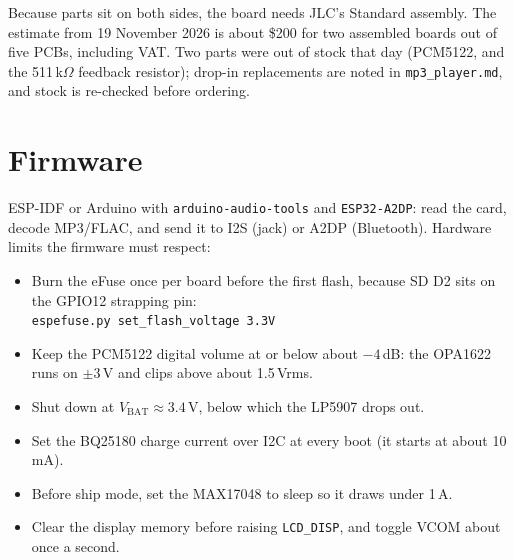 \documentclass[11pt,a4paper]{article}
\begin{document}
Because parts sit on both sides, the board needs JLC's Standard assembly. The estimate from 19 November 2026 is about \$200
for two assembled boards out of five PCBs, including VAT. Two parts were out of stock that day (PCM5122, and the 511\,k$\Omega$ feedback resistor);
drop-in replacements are noted in \texttt{mp3\_player.md}, and stock is re-checked before ordering.

\section{Firmware}
\sloppy
ESP-IDF or Arduino with \texttt{arduino-audio-tools} and \texttt{ESP32-A2DP}: read the card, decode MP3/FLAC, and send it to I2S (jack) or A2DP (Bluetooth).
Hardware limits the firmware must respect:
\begin{itemize}\sloppy
  \item Burn the eFuse once per board before the first flash, because SD D2 sits on the GPIO12 strapping pin:\\ \texttt{espefuse.py set\_flash\_voltage 3.3V}
  \item Keep the PCM5122 digital volume at or below about $-4$\,dB: the OPA1622 runs on $\pm3$\,V and clips above about 1.5\,Vrms.
  \item Shut down at $V_\mathrm{BAT} \approx 3.4$\,V, below which the LP5907 drops out.
  \item Set the BQ25180 charge current over I2C at every boot (it starts at about 10\,mA).
  \item Before ship mode, set the MAX17048 to sleep so it draws under 1\,\textmu A.
  \item Clear the display memory before raising \texttt{LCD\_DISP}, and toggle VCOM about once a second.
\end{itemize}
\end{document}
